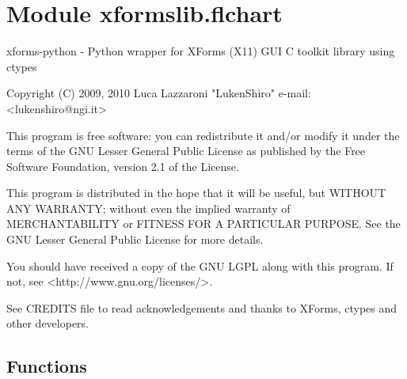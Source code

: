 %
%
%


\section{Module xformslib.flchart}

    \label{xformslib:flchart}
xforms-python - Python wrapper for XForms (X11) GUI C toolkit library using
ctypes

Copyright (C) 2009, 2010  Luca Lazzaroni "LukenShiro" e-mail:  
{\textless}lukenshiro@ngi.it{\textgreater}

This program is free software: you can redistribute it and/or modify it 
under the terms of the GNU Lesser General Public License as published by 
the Free Software Foundation, version 2.1 of the License.

This program is distributed in the hope that it will be useful, but WITHOUT
ANY WARRANTY; without even the implied warranty of MERCHANTABILITY or 
FITNESS FOR A PARTICULAR PURPOSE. See the GNU Lesser General Public License
for more details.

You should have received a copy of the GNU LGPL along with this program. If
not, see {\textless}http://www.gnu.org/licenses/{\textgreater}.

See CREDITS file to read acknowledgements and thanks to XForms, ctypes and 
other developers.



  \subsection{Functions}

    \label{xformslib:flchart:fl_add_chart}

